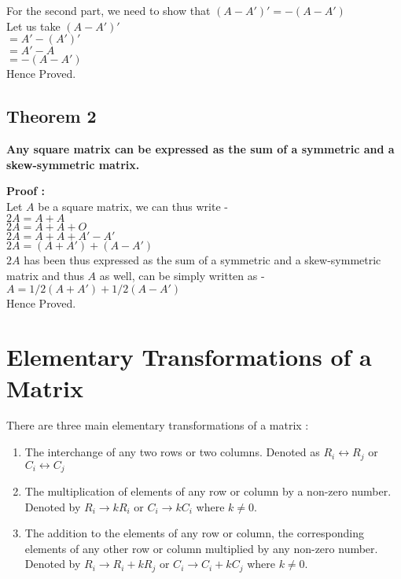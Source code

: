 \documentclass[12pt, letterpaper]{article}
\begin{document}
For the second part, we need to show that $(A - A')' = -(A - A')$\\
Let us take $(A - A')'$\\
$= A' - (A')'$\\
$ = A' - A$\\
$= -(A - A')$\\
Hence Proved.


\subsection{Theorem 2}
\begin{displayquote}
\textbf{Any square matrix can be expressed as the sum of a symmetric and a skew-symmetric matrix.}
\end{displayquote}
\textbf{Proof :}\\
Let $A$ be a square matrix, we can thus write -\\
$2A = A + A$\\
$2A = A + A + O$\\
$2A = A + A + A' - A'$\\
$2A = (A+A') + (A-A')$\\
$2A$ has been thus expressed as the sum of a symmetric and a skew-symmetric matrix and thus $A$ as well, can be simply written as - \\
$ A = 1/2(A+A') + 1/2(A-A')$\\
Hence Proved.

\section{Elementary Transformations of a Matrix}
There are three main elementary transformations of a matrix : 
\begin{enumerate}
    \item The interchange of any two rows or two columns. Denoted as $R_i \leftrightarrow R_j$ or $C_i \leftrightarrow C_j$
    \item The multiplication of elements of any row or column by a non-zero number. Denoted by $R_i \rightarrow kR_i$ or $C_i \rightarrow kC_i$ where $k \neq 0$.
    \item The addition to the elements of any row or column, the corresponding elements of any other row or column multiplied by any non-zero number. Denoted by $R_i \rightarrow R_i + kR_j$ or $C_i \rightarrow C_i + kC_j$ where $k \neq 0$.
\end{enumerate}
\end{document}
